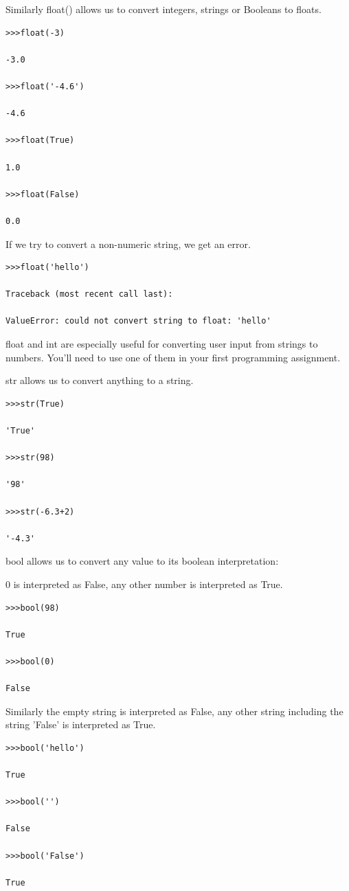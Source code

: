 \documentclass{article}
\begin{document}
Similarly float() allows us to convert integers, strings or Booleans to floats. 
\begin{lstlisting}
>>>float(-3)

-3.0

>>>float('-4.6')

-4.6

>>>float(True)

1.0

>>>float(False)

0.0
\end{lstlisting}

If we try to convert a non-numeric string, we get an error.

\begin{lstlisting}
>>>float('hello')

Traceback (most recent call last):

ValueError: could not convert string to float: 'hello'
\end{lstlisting}

float and int are especially useful for converting user input from strings to numbers. You'll need to use one of them in your first programming assignment.

str allows us to convert anything to a string.
\begin{lstlisting}
>>>str(True)

'True'

>>>str(98)

'98'

>>>str(-6.3+2)

'-4.3'
\end{lstlisting}

bool allows us to convert any value to its boolean interpretation:

0 is interpreted as False, any other number is interpreted as True.

\begin{lstlisting}
>>>bool(98)

True

>>>bool(0)

False
\end{lstlisting}

Similarly the empty string is interpreted as False, any other string including the string 'False' is interpreted as True.
\begin{lstlisting}
>>>bool('hello')

True

>>>bool('')

False

>>>bool('False')

True
\end{lstlisting}
\end{document}
